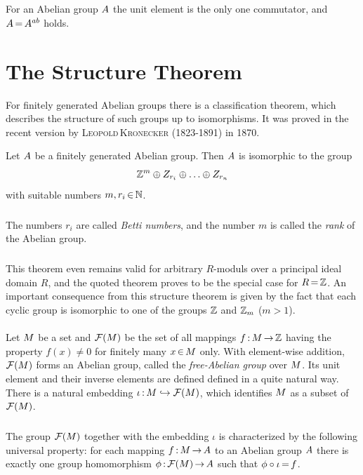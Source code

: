 \documentclass[11pt,twoside]{article}
\begin{document}
\subparagraph{}
For an Abelian group $A$ the unit element
is the only one commutator,
and $A {\,=\,} A^{ab}$ holds.

\section{The Structure Theorem}
For finitely generated Abelian groups there is a classification theorem,
which describes the structure of such groups up to isomorphisms.
It was proved in the recent version by \textsc{Leopold\,Kronecker} (1823-1891)
in 1870.

\begin{theorem}
Let $A$ be a {finitely generated} Abelian group.
Then $A$ is isomorphic to the group
\[
{\mathbb{Z}}^m \oplus Z_{r_i} \oplus \ldots \oplus Z_{r_n}
\]
with suitable numbers $m, r_i {\,\in\,} {\mathbb{N}}$.
\end{theorem}

\subparagraph{}
The numbers $r_i$ are called \textit{Betti numbers},
and the number $m$ is called the \textit{rank} of the Abelian group.

\subparagraph{}
This theorem even remains valid for arbitrary $R$-moduls
over a principal ideal domain $R$,
and the quoted theorem proves to be the special case for $R {\,=\,} {\mathbb{Z}}$.
An important consequence from this structure theorem is given by the fact
that each cyclic group is isomorphic to one of the groups
${\mathbb{Z}}$ and ${\mathbb{Z}}_m$ ($m > 1$).

\paragraph{}
Let $M$ be a set and ${\mathcal{F}}(M)$ be
the set of all mappings $f {\,:\,} M {\,\to\,} {\mathbb{Z}}$
having the property $f(x) \neq 0$ for finitely many $x {\,\in\,} M$ only.
With element-wise addition,
${\mathcal{F}}(M)$ forms an Abelian group,
called the \textit{free-Abelian group} over $M$.
Its unit element and their inverse elements
are defined defined in a quite natural way.
There is a natural embedding $\iota{\,:\,}M \hookrightarrow {\mathcal{F}}(M)$,
which identifies $M$ as a subset of ${\mathcal{F}}(M)$.

\subparagraph{}
The group ${\mathcal{F}}(M)$ together with the embedding $\iota$ is characterized
by the following universal property:
for each mapping $f {\,:\,} M {\,\to\,} A$ to an Abelian group $A$
there is exactly one group homomorphism $\phi {\,:\,} {\mathcal{F}}(M) {\,\to\,} A$
such that $\phi \circ \iota {\,=\,} f$.
\end{document}
